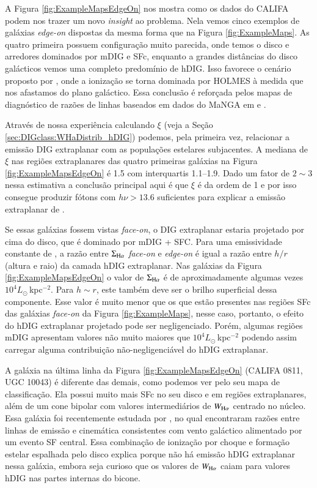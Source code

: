 A Figura \ref{fig:ExampleMapsEdgeOn} nos mostra como os dados do CALIFA podem nos trazer um novo {\em insight} ao problema. Nela vemos cinco exemplos de galáxias {\em edge-on} dispostas da mesma forma que na Figura \ref{fig:ExampleMaps}. As quatro primeira possuem configuração muito parecida, onde temos o disco e arredores dominados por mDIG e SFc, enquanto a grandes distâncias do disco galácticos vemos uma completo predomínio de hDIG. Isso favorece o cenário proposto por \citet{FloresFajardo.eteal.2011a}, onde a ionização se torna dominada por HOLMES à medida que nos afastamos do plano galáctico. Essa conclusão é reforçada pelos mapas de diagnóstico de razões de linhas baseados em dados do MaNGA em \citet{Belfiore.etal.2016} e \citet{Zhang.etal.2017a}.

Através de nossa experiência calculando $\xi$ (veja a Seção \ref{sec:DIGclass:WHaDistrib_hDIG}) podemos, pela primeira vez, relacionar a emissão DIG extraplanar com as populações estelares subjacentes. A mediana de $\xi$ nas regiões extraplanares das quatro primeiras galáxias na Figura \ref{fig:ExampleMapsEdgeOn} é 1.5 com interquartis 1.1--1.9. Dado um fator de $2 \sim 3$ nessa estimativa \citep{CidFernandes.etal.2011a} a conclusão principal aqui é que $\xi$ é da ordem de 1 e por isso consegue produzir fótons com $h\nu > 13.6$ suficientes para explicar a emissão extraplanar de \Ha.

Se essas galáxias fossem vistas {\em face-on}, o DIG extraplanar estaria projetado por cima do disco, que é dominado por mDIG + SFC. Para uma emissividade constante de \Ha, a razão entre $\Sigma_{\Ha}$ {\em face-on} e {\em edge-on} é igual a razão entre $h/r$ (altura e raio) da camada hDIG extraplanar. Nas galáxias da Figura \ref{fig:ExampleMapsEdgeOn} o valor de $\Sigma_{\Ha}$ é de aproximadamente algumas vezes $10^4 L_\odot\,$kpc$^{-2}$. Para $h \sim r$, este também deve ser o brilho superficial dessa componente. Esse valor é muito menor que os que estão presentes nas regiões SFc das galáxias {\em face-on} da Figura \ref{fig:ExampleMaps}, nesse caso, portanto, o efeito do hDIG extraplanar projetado pode ser negligenciado. Porém, algumas regiões mDIG apresentam valores não muito maiores que $10^4 L_\odot\,$kpc$^{-2}$ podendo assim carregar alguma contribuição não-negligenciável do hDIG extraplanar.

A galáxia na última linha da Figura \ref{fig:ExampleMapsEdgeOn} (CALIFA 0811, UGC 10043) é diferente das demais, como podemos ver pelo seu mapa de classificação. Ela possui muito mais SFc no seu disco e em regiões extraplanares, além de um cone bipolar com valores intermediários de $W_{\Ha}$ centrado no núcleo. Essa galáxia foi recentemente estudada por \citet{LopezCoba.etal.2017}, no qual encontraram razões entre linhas de emissão e cinemática consistentes com vento galáctico alimentado por um evento SF central. Essa combinação de ionização por choque e formação estelar espalhada pelo disco explica porque não há emissão hDIG extraplanar nessa galáxia, embora seja curioso que os valores de $W_{\Ha}$ caiam para valores hDIG nas partes internas do bicone.


